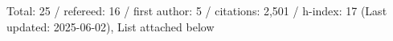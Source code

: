 Total: 25 / refereed: 16 / first author: 5 / citations: 2,501 / h-index: 17 (Last updated: 2025-06-02), List attached below
